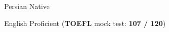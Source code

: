 

\begin{cvskills}

  \cvskill
    {Persian} %
    {Native} %

  \cvskill
    {English} %
    {Proficient (\textbf{TOEFL} mock test: \textbf{107 / 120})} %

\end{cvskills}
